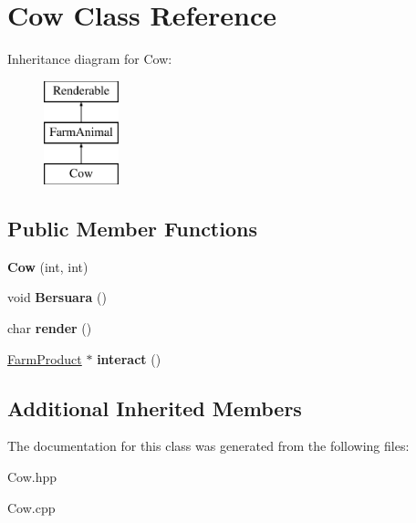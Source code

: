 \hypertarget{class_cow}{}\section{Cow Class Reference}
\label{class_cow}
Inheritance diagram for Cow\+:\begin{figure}[H]
\begin{center}
\leavevmode
\includegraphics[height=3.000000cm]{class_cow}
\end{center}
\end{figure}
\subsection*{Public Member Functions}
\begin{DoxyCompactItemize}
\item 
\mbox{\label{class_cow_a55a5b390a19207454d6f22dd62cad6e4}} 
{\bfseries Cow} (int, int)
\item 
\mbox{\label{class_cow_a4429fc0e583d8f5f937aa280247d3d6d}} 
void {\bfseries Bersuara} ()
\item 
\mbox{\label{class_cow_a3d1e7ab6e78229968e177705d06667b8}} 
char {\bfseries render} ()
\item 
\mbox{\label{class_cow_a60c82453e3d1ee909c97384b26d8b72d}} 
\mbox{\hyperlink{class_farm_product}{Farm\+Product}} $\ast$ {\bfseries interact} ()
\end{DoxyCompactItemize}
\subsection*{Additional Inherited Members}


The documentation for this class was generated from the following files\+:\begin{DoxyCompactItemize}
\item 
Cow.\+hpp\item 
Cow.\+cpp\end{DoxyCompactItemize}
